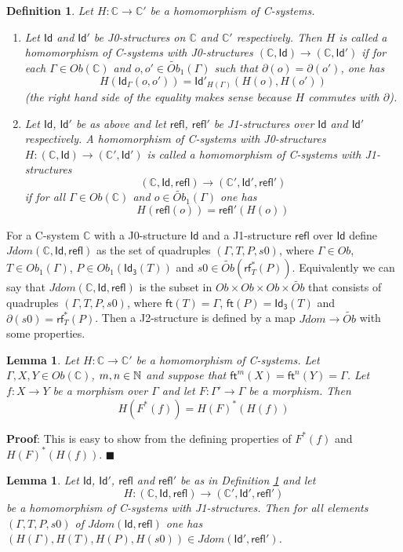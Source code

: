 \documentclass[12pt]{article}
\numberwithin{equation}{section}
\newenvironment{myproof}{{\bf Proof}:}{$\blacksquare$ \vskip 5mm }
\newtheorem{lemma}[proposition]{Lemma}
\newtheorem{definition}[proposition]{Definition}
\newcommand{\sr}{\rightarrow}
\newcommand{\nn}{{\mathbb N\rm}}
\newcommand{\wt}{\widetilde}
\newcommand{\CC}{{\mathbb C}}  %
\newcommand{\ft}{\mathsf{ft}}
\newcommand{\Id}{\mathsf{Id}} %
\newcommand{\Idx}{\mathsf{Id_3}} %
\newcommand{\refl}{\mathsf{refl}}
\newcommand{\rf}{\mathsf{rf}}
\newcommand{\Obwt}{\wt{Ob}}
\begin{document}
%
\begin{definition}
\label{2015.04.06.def1} Let $H:\CC\sr \CC'$ be a homomorphism of C-systems.
%
\begin{enumerate}
\item Let $\Id$ and $\Id'$ be J0-structures on $\CC$ and $\CC'$ respectively.  Then
  $H$ is called a homomorphism of C-systems with J0-structures $(\CC,\Id)\sr
  (\CC,\Id')$ if for each $\Gamma\in Ob(\CC)$ and $o,o'\in\Obwt_1(\Gamma)$ such
  that $\partial(o)=\partial(o')$, one has
%
$$H(\Id_{\Gamma}(o,o'))=\Id'_{H(\Gamma)}(H(o),H(o'))$$
%
(the right hand side of the equality makes sense because $H$ commutes with
  $\partial$).
% 
\item Let $\Id$, $\Id'$ be as above and let $\refl$, $\refl'$ be J1-structures
  over $\Id$ and $\Id'$ respectively. A homomorphism of C-systems with
  J0-structures $H:(\CC,\Id)\sr (\CC',\Id')$ is called a homomorphism of
  C-systems with J1-structures
%
$$(\CC,\Id,\refl)\sr (\CC',\Id',\refl')$$
%
if for all $\Gamma\in Ob(\CC)$ and $o\in \Obwt_1(\Gamma)$ one has
%
$$H(\refl(o))=\refl'(H(o))$$
%
\end{enumerate}
\end{definition}
%
For a C-system $\CC$ with a J0-structure $\Id$ and a J1-structure $\refl$ over
$\Id$ define $Jdom(\CC,\Id,\refl)$ as the set of quadruples $(\Gamma,T,P,s0)$,
where $\Gamma\in Ob$, $T\in Ob_1(\Gamma)$, $P\in Ob_1(\Idx(T))$ and $s0\in
\Obwt(\rf_T^*(P))$. Equivalently we can say that $Jdom(\CC,\Id,\refl)$ is the
subset in $Ob\times Ob\times Ob\times \Obwt$ that consists of quadruples
$(\Gamma,T,P,s0)$, where $\ft(T)=\Gamma$, $\ft(P)=\Idx(T)$ and
$\partial(s0)=\rf_T^*(P)$. Then a J2-structure is defined by a map $Jdom\sr
\Obwt$ with some properties.
%
\begin{lemma}
\label{2015.04.06.l3} Let $H:\CC\sr \CC'$ be a homomorphism of C-systems. Let
$\Gamma,X,Y\in Ob(\CC)$, $m,n\in\nn$ and suppose that
$\ft^m(X)=\ft^{n}(Y)=\Gamma$. Let $f:X\sr Y$ be a morphism over $\Gamma$ and let
$F:\Gamma'\sr \Gamma$ be a morphism. Then
%
$$H(F^*(f))=H(F)^*(H(f))$$
%
\end{lemma}
%
\begin{myproof}
This is easy to show from the defining properties of $F^*(f)$ and
$H(F)^*(H(f))$.
\end{myproof}
%
%
\begin{lemma}
\label{2015.04.06.l2} Let $\Id$, $\Id'$, $\refl$ and $\refl'$ be as in
Definition \ref{2015.04.06.def1} and let
%
$$H:(\CC,\Id,\refl)\sr (\CC',\Id',\refl')$$
%
be a homomorphism of C-systems with J1-structures. Then for all elements
$(\Gamma,T,P,s0)$ of $Jdom(\Id,\refl)$ one has $(H(\Gamma),H(T),H(P),H(s0))\in
Jdom(\Id',\refl')$.
\end{lemma}
\end{document}
